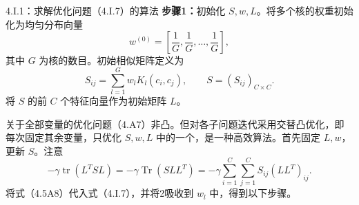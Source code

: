\begin{bookalgorithm}{4.I.1：求解优化问题（4.I.7）的算法}
\textbf{步骤1：}初始化 $S,w,L$。将多个核的权重初始化为均匀分布向量
\[
w^{(0)}=\left[\frac1G,\frac1G,\ldots,\frac1G\right],
\]
其中 $G$ 为核的数目。初始相似矩阵定义为
\[
S_{ij}=\sum_{l=1}^{G}w_lK_l(c_i,c_j),\qquad S=(S_{ij})_{C\times C}.
\]
将 $S$ 的前 $C$ 个特征向量作为初始矩阵 $L$。

关于全部变量的优化问题（4.A7）非凸。但对各子问题迭代采用交替凸优化，即每次固定其余变量，只优化 $S,w,L$ 中的一个，是一种高效算法。首先固定 $L,w$，更新 $S$。注意
\begin{equation}
-\gamma\operatorname{tr}(L^TSL)=-\gamma\operatorname{Tr}(SLL^T)
=-\gamma\sum_{i=1}^{C}\sum_{j=1}^{C}S_{ij}(LL^T)_{ij}.\tag{4.I.8}
\end{equation}
将式（4.5A8）代入式（4.I.7），并将2吸收到 $w_l$ 中，得到以下步骤。


\end{bookalgorithm}
